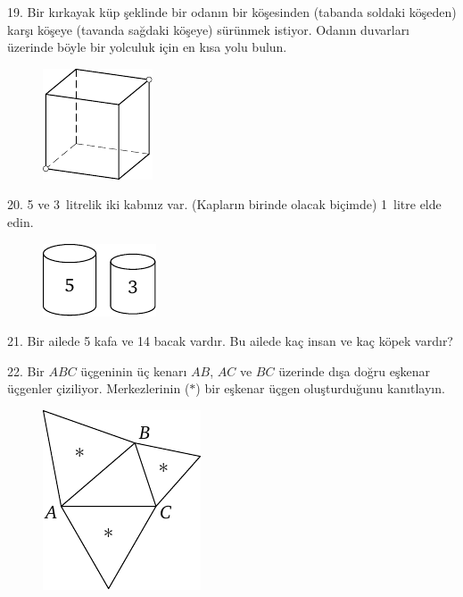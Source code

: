 \begin{problem}{19.}
Bir kırkayak küp şeklinde bir odanın bir köşesinden (tabanda soldaki köşeden) karşı köşeye (tavanda sağdaki köşeye) sürünmek istiyor. Odanın duvarları üzerinde böyle bir yolculuk için en kısa yolu bulun.
	\begin{figure}
		\includegraphics{resources/taskbook-3}
	\end{figure}
\end{problem}

\begin{problem}{20.}
5 ve 3~litrelik iki kabınız var. (Kapların birinde olacak biçimde) 1~litre elde edin.
	\begin{figure}
		\includegraphics{resources/taskbook-4}
	\end{figure}
\end{problem}


\begin{problem}{21.}
Bir ailede 5 kafa ve 14 bacak vardır. Bu ailede kaç insan ve kaç köpek vardır?
\end{problem}

\begin{problem}{22.}
	Bir $ABC$ üçgeninin üç kenarı $AB$, $AC$ ve $BC$ üzerinde dışa doğru eşkenar üçgenler çiziliyor. Merkezlerinin ($*$) bir eşkenar üçgen oluşturduğunu kanıtlayın.
	\begin{figure}
		\includegraphics{resources/taskbook-6}
	\end{figure}
\end{problem}

